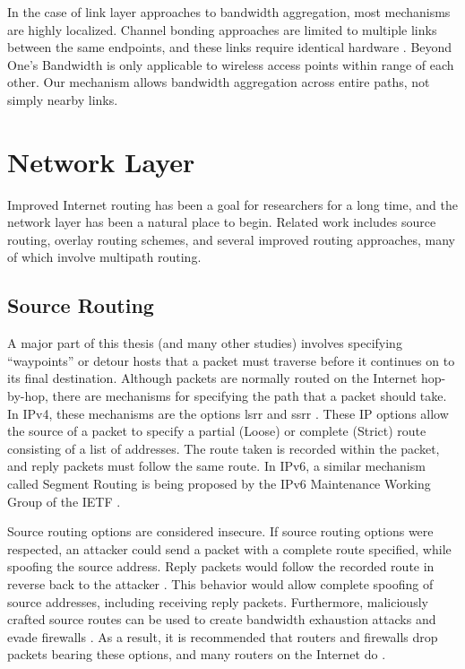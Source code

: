 \documentclass{cwru}
\begin{document}
In the case of link layer approaches to bandwidth aggregation, most mechanisms
are highly localized. Channel bonding approaches are limited to multiple links
between the same endpoints, and these links require identical hardware
\cite{chiussi1998generalized}. Beyond One's Bandwidth is only applicable to
wireless access points within range of each other. Our mechanism allows
bandwidth aggregation across entire paths, not simply nearby links.

\section{Network Layer}

Improved Internet routing has been a goal for researchers for a long time, and
the network layer has been a natural place to begin. Related work includes
source routing, overlay routing schemes, and several improved routing
approaches, many of which involve multipath routing.

\subsection{Source Routing}

A major part of this thesis (and many other studies) involves specifying
``waypoints'' or detour hosts that a packet must traverse before it continues on
to its final destination. Although packets are normally routed on the Internet
hop-by-hop, there are mechanisms for specifying the path that a packet should
take. In IPv4, these mechanisms are the options \ac{lsrr} and \ac{ssrr}
\cite{rfc791}. These IP options allow the source of a packet to specify a
partial (Loose) or complete (Strict) route consisting of a list of addresses.
The route taken is recorded within the packet, and reply packets must follow the
same route. In IPv6, a similar mechanism called Segment Routing is being
proposed by the IPv6 Maintenance Working Group of the IETF
\cite{draft-segment-routing}.

Source routing options are considered insecure. If source routing options were
respected, an attacker could send a packet with a complete route specified,
while spoofing the source address. Reply packets would follow the recorded route
in reverse back to the attacker \cite{bellovin1989security}. This behavior would
allow complete spoofing of source addresses, including receiving reply packets.
Furthermore, maliciously crafted source routes can be used to create bandwidth
exhaustion attacks and evade firewalls \cite{rfc7126}. As a result, it is
recommended that routers and firewalls drop packets bearing these options, and
many routers on the Internet do \cite{rfc7126}.
\end{document}
